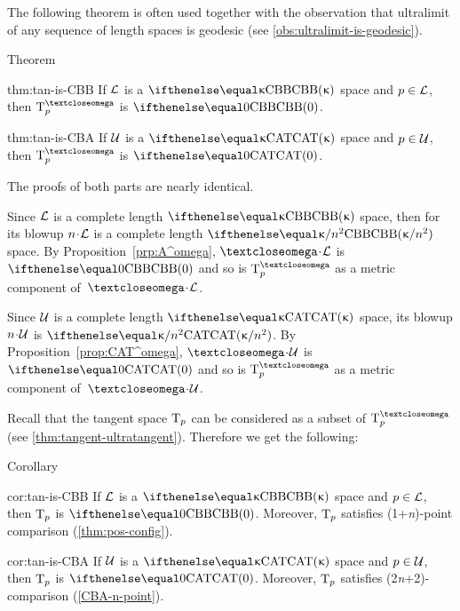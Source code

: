 The following theorem is often used together with the 
observation that ultralimit of any sequence of length spaces is geodesic (see \ref{obs:ultralimit-is-geodesic}).

\begin{thm}{Theorem}\label{thm:tan-is}
\begin{subthm}{thm:tan-is-CBB}
If $\mathcal{L}$ is a $\Alex{\kappa}$ space and $p\in \spc{L}$, then $\T^\o_p$ is $\Alex{0}$.
\end{subthm}

\begin{subthm}{thm:tan-is-CBA}
If $\mathcal{U}$ is a $\CAT\kappa$ space and $p\in \spc{U}$, then $\T^\o_p$ is $\CAT0$.
\end{subthm}

\end{thm}

The proofs of both parts are nearly identical.

Since $\mathcal{L}$ is a complete length $\Alex{\kappa}$ space, then for its blowup $n\cdot\spc{L}$ is a complete length $\Alex{\kappa/{n^{2}}}$ space.
By Proposition~\ref{prp:A^omega}, $\o\cdot\spc{L}$ is $\Alex0$
and so is $\T_p^\o$ as a metric component of~$\o\cdot\spc{L}$.

Since $\mathcal{U}$ is a complete length $\CAT\kappa$ space, its blowup $n\cdot\spc{U}$ is $\CAT{\kappa/{n^{2}}}$.
By Proposition~\ref{prop:CAT^omega}, $\o\cdot\spc{U}$ is $\CAT0$
and so is $\T_p^\o$ as a metric component of~$\o\cdot\spc{U}$.
\qeds

Recall that the tangent space $\text{\rm T}_p$ can be considered as a subset of $\T^\o_p$ (see \ref{thm:tangent-ultratangent}).
Therefore we get the following:

\begin{thm}{Corollary}\label{cor:real-tan-is}
\begin{subthm}{cor:tan-is-CBB}
If $\mathcal{L}$ is a $\Alex{\kappa}$ space and $p\in \spc{L}$, then $\text{\rm T}_p$ is $\Alex{0}$.
Moreover, $\text{\rm T}_p$ satisfies (1+\textit{n})-point comparison (\ref{thm:pos-config}).
\end{subthm}

\begin{subthm}{cor:tan-is-CBA}
If $\mathcal{U}$ is a $\CAT\kappa$ space and $p\in \spc{U}$, then $\text{\rm T}_p$ is $\CAT0$.
Moreover, $\text{\rm T}_p$ satisfies (2\textit{n}+2)-comparison (\ref{CBA-n-point}).
\end{subthm}

\end{thm}



